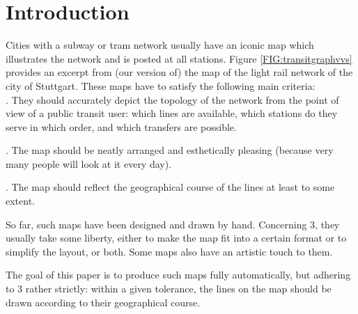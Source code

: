 \documentclass{llncs}
\newcommand\TODO[1]{\textcolor{blue}{\small [TODO: #1]}}
\begin{document}
%
\section{Introduction}\label{SEC:intro}
%
Cities with a subway or tram network usually have an iconic map which illustrates the network and is posted at all stations.
Figure \ref{FIG:transitgraphvvs} provides an excerpt from (our version of) the map of the light rail network of the city of Stuttgart.
These maps have to satisfy the following main criteria:\\[-3mm]

. They should accurately depict the topology of the network from the point of view of a public transit user: which lines are available, which stations do they serve in which order, and which transfers are possible.

\smallskip{}. The map should be neatly arranged and esthetically pleasing (because very many people will look at it every day).

\smallskip{}. The map should reflect the geographical course of the lines at least to some extent.

\smallskip\noindent
So far, such maps have been designed and drawn by hand.
Concerning 3, they usually take some liberty, either to make the map fit into a certain format or to simplify the layout, or both.
Some maps also have an artistic touch to them.

The goal of this paper is to produce such maps fully automatically, but adhering to 3 rather strictly: within a given tolerance, the lines on the map should be drawn according to their geographical course.
\end{document}
